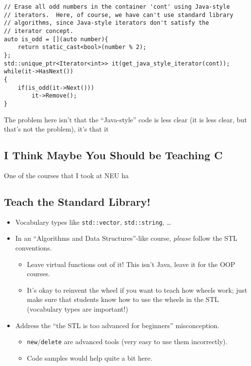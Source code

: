 \documentclass{article}
\newcommand{\CppNew}{\lstinline{new}}
\newcommand{\CppDelete}{\lstinline{delete}}
\newcommand{\placeholdertext}[1]{
	\noindent{\color{red}{#1}}
}
\begin{document}
\begin{lstlisting}
// Erase all odd numbers in the container 'cont' using Java-style
// iterators.  Here, of course, we have can't use standard library
// algorithms, since Java-style iterators don't satisfy the 
// iterator concept.
auto is_odd = [](auto number){
	return static_cast<bool>(number % 2);
};
std::unique_ptr<Iterator<int>> it(get_java_style_iterator(cont));
while(it->HasNext())
{
	if(is_odd(it->Next()))
		it->Remove();
}
\end{lstlisting}

The problem here isn't that the ``Java-style'' code is less clear (it is less clear, but that's not the problem), it's that it 

\subsection{I Think Maybe You Should be Teaching C}
One of the courses that I took at NEU ha





\subsection*{Teach the Standard Library!}
\placeholdertext{Address the following:}
\begin{itemize}
	\item Vocabulary types like \texttt{std::vector}, \texttt{std::string}, \ldots
	\item In an ``Algorithms and Data Structures''-like course, \emph{please} follow the STL conventions.
	\begin{itemize}
		\item Leave virtual functions out of it!  This isn't Java, leave it for the OOP courses.
		\item It's okay to reinvent the wheel if you want to teach how wheels work; just make sure that students know how to use the wheels in the STL (vocabulary types are important!)
	\end{itemize}
	\item Address the ``the STL is too advanced for beginners'' misconception.
	\begin{itemize}
		\item \CppNew{}/\CppDelete{} are advanced tools (very easy to use them incorrectly).
		\item Code samples would help quite a bit here.
	\end{itemize}
\end{itemize}
\end{document}
